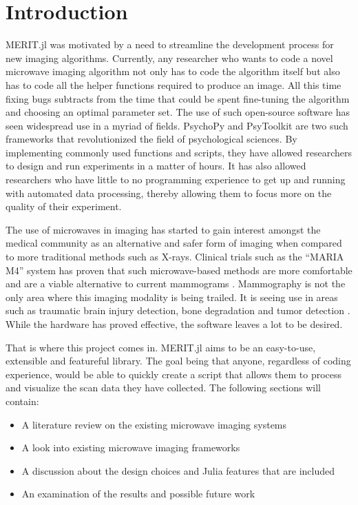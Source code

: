 \chapter*{Introduction}
MERIT.jl was motivated by a need to streamline the development process for new imaging algorithms. Currently, any
researcher who wants to code a novel microwave imaging algorithm not only has to code the algorithm itself but also has
to code all the helper functions required to produce an image. All this time fixing bugs subtracts from the time that could
be spent fine-tuning the algorithm and choosing an optimal parameter set. The use of such open-source software has seen
widespread use in a myriad of fields. PsychoPy and PsyToolkit are two such frameworks that revolutionized the field of
psychological sciences. By implementing commonly used functions and scripts, they have allowed researchers to design and
run experiments in a matter of hours. It has also allowed researchers who have little to no programming experience
to get up and running with automated data processing, thereby allowing them to focus more on the quality of their
experiment. \cite{stoetPsyToolkitTestimonials} \hfill \break

The use of microwaves in imaging has started to gain interest amongst the medical community as an alternative and safer
form of imaging when compared to more traditional methods such as X-rays. Clinical trials such as the ``MARIA M4''
system has proven that such microwave-based methods are more comfortable and are a viable alternative to current
mammograms \cite{preeceMARIAM4Clinical2016}. Mammography is not the only area where this imaging modality is being
trailed. It is seeing use in areas such as traumatic brain injury detection, bone degradation and tumor detection
\cite{alsbouMedicalImagingSystem2023}. While the hardware has proved effective, the software leaves a lot to be desired.
\hfill \break

That is where this project comes in. MERIT.jl aims to be an easy-to-use, extensible and featureful library. The goal
being that anyone, regardless of coding experience, would be able to quickly create a script that allows them to process
and visualize the scan data they have collected. The following sections will contain: 

\begin{itemize}
    \item A literature review on the existing microwave imaging systems
    \item A look into existing microwave imaging frameworks
    \item A discussion about the design choices and Julia features that are included
    \item An examination of the results and possible future work
\end{itemize}


